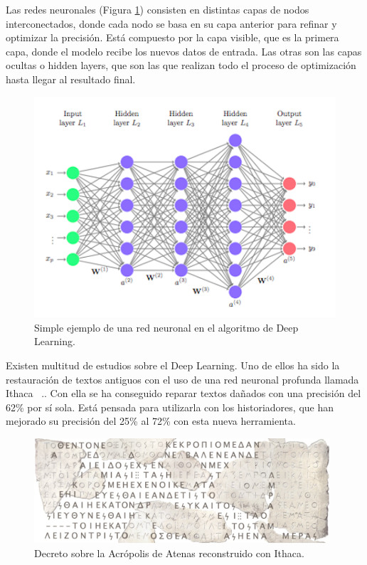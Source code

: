 Las redes neuronales (Figura \ref{fig:red}) consisten en distintas capas de nodos interconectados, donde cada nodo se basa en su capa anterior para refinar y optimizar la precisión. Está compuesto por la capa visible, que es la primera capa, donde el modelo recibe los nuevos datos de entrada. Las otras son las capas ocultas o hidden layers, que son las que realizan todo el proceso de optimización hasta llegar al resultado final.\\
\begin{figure} [h!]
  \begin{center}
    \includegraphics[width=12cm]{figs/deep_learning}
  \end{center}
  \caption[]{Simple ejemplo de una red neuronal en el algoritmo de Deep Learning. \footnotemark}
  \label{fig:red}
\end{figure}

Existen multitud de estudios sobre el Deep Learning. Uno de ellos ha sido la restauración de textos antiguos con el uso de una red neuronal profunda llamada Ithaca ~\cite{assael22}.. Con ella se ha conseguido reparar textos dañados con una precisión del 62\% por sí sola. Está pensada para utilizarla con los historiadores, que han mejorado su precisión del 25\% al 72\% con esta nueva herramienta.
\begin{figure} [h!]
  \begin{center}
    \includegraphics[width=11cm]{figs/textos}
  \end{center}
  \caption{Decreto sobre la Acrópolis de Atenas reconstruido con Ithaca.}
  \label{fig:visual}
\end{figure}

